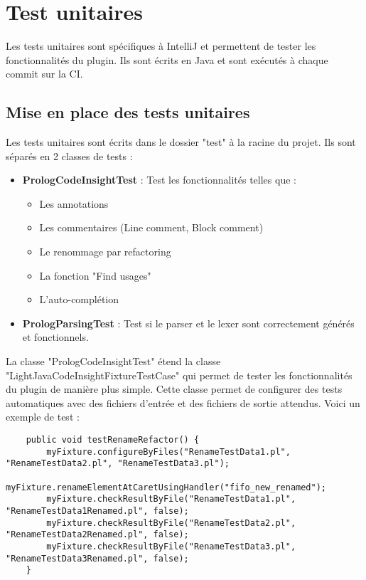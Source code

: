 \chapter{Test unitaires}
\noindent Les tests unitaires sont spécifiques à IntelliJ et permettent de tester les fonctionnalités du plugin.
Ils sont écrits en Java et sont exécutés à chaque commit sur la CI.


\section{Mise en place des tests unitaires}

\noindent Les tests unitaires sont écrits dans le dossier "test" à la racine du projet.
\newdoubleline Ils sont séparés en 2 classes de tests :
\begin{itemize}
    \item \textbf{PrologCodeInsightTest} : Test les fonctionnalités telles que :
    \begin{itemize}
        \item Les annotations
        \item Les commentaires (Line comment, Block comment)
        \item Le renommage par refactoring
        \item La fonction "Find usages"
        \item L'auto-complétion
    \end{itemize}
    \item \textbf{PrologParsingTest} : Test si le parser et le lexer sont correctement générés et fonctionnels.
\end{itemize}

\noindent La classe "PrologCodeInsightTest" étend la classe "LightJavaCodeInsightFixtureTestCase" qui permet de tester les fonctionnalités du plugin de manière plus simple.
\newdoubleline Cette classe permet de configurer des tests automatiques avec des fichiers d'entrée et des fichiers de sortie attendus. Voici un exemple de test :
\begin{lstlisting}
    public void testRenameRefactor() {
        myFixture.configureByFiles("RenameTestData1.pl", "RenameTestData2.pl", "RenameTestData3.pl");
        myFixture.renameElementAtCaretUsingHandler("fifo_new_renamed");
        myFixture.checkResultByFile("RenameTestData1.pl", "RenameTestData1Renamed.pl", false);
        myFixture.checkResultByFile("RenameTestData2.pl", "RenameTestData2Renamed.pl", false);
        myFixture.checkResultByFile("RenameTestData3.pl", "RenameTestData3Renamed.pl", false);
    }
\end{lstlisting}


